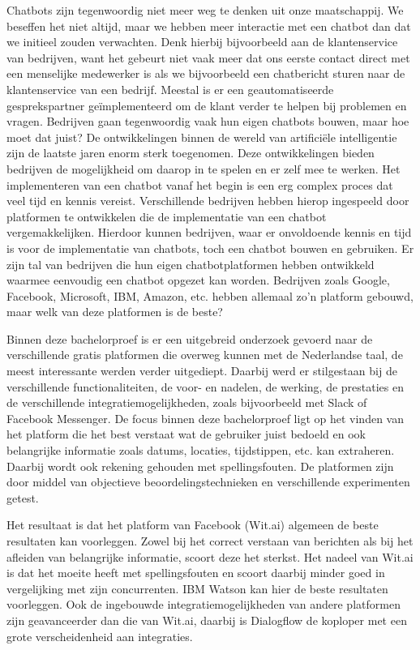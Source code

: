 Chatbots zijn tegenwoordig niet meer weg te denken uit onze maatschappij. We beseffen het niet altijd, maar we hebben meer interactie met een chatbot dan dat we initieel zouden verwachten. Denk hierbij bijvoorbeeld aan de klantenservice van bedrijven, want het gebeurt niet vaak meer dat ons eerste contact direct met een menselijke medewerker is als we bijvoorbeeld een chatbericht sturen naar de klantenservice van een bedrijf. Meestal is er een geautomatiseerde gesprekspartner geïmplementeerd om de klant verder te helpen bij problemen en vragen. Bedrijven gaan tegenwoordig vaak hun eigen chatbots bouwen, maar hoe moet dat juist? De ontwikkelingen binnen de wereld van artificiële intelligentie zijn de laatste jaren enorm sterk toegenomen. Deze ontwikkelingen bieden bedrijven de mogelijkheid om daarop in te spelen en er zelf mee te werken. Het implementeren van een chatbot vanaf het begin is een erg complex proces dat veel tijd en kennis vereist. Verschillende bedrijven hebben hierop ingespeeld door platformen te ontwikkelen die de implementatie van een chatbot vergemakkelijken. Hierdoor kunnen bedrijven, waar er onvoldoende kennis en tijd is voor de implementatie van chatbots, toch een chatbot bouwen en gebruiken. Er zijn tal van bedrijven die hun eigen chatbotplatformen hebben ontwikkeld waarmee eenvoudig een chatbot opgezet kan worden. Bedrijven zoals Google, Facebook, Microsoft, IBM, Amazon, etc. hebben allemaal zo’n platform gebouwd, maar welk van deze platformen is de beste?

Binnen deze bachelorproef is er een uitgebreid onderzoek gevoerd naar de verschillende gratis platformen die overweg kunnen met de Nederlandse taal, de meest interessante werden verder uitgediept. Daarbij werd er stilgestaan bij de verschillende functionaliteiten, de voor- en nadelen, de werking, de prestaties en de verschillende integratiemogelijkheden, zoals bijvoorbeeld met Slack of Facebook Messenger. De focus binnen deze bachelorproef ligt op het vinden van het platform die het best verstaat wat de gebruiker juist bedoeld en ook belangrijke informatie zoals datums, locaties, tijdstippen, etc. kan extraheren. Daarbij wordt ook rekening gehouden met spellingsfouten. De platformen zijn door middel van objectieve beoordelingstechnieken en verschillende experimenten getest. 

Het resultaat is dat het platform van Facebook (Wit.ai) algemeen de beste resultaten kan voorleggen. Zowel bij het correct verstaan van berichten als bij het afleiden van belangrijke informatie, scoort deze het sterkst. Het nadeel van Wit.ai is dat het moeite heeft met spellingsfouten en scoort daarbij minder goed in vergelijking met zijn concurrenten. IBM Watson kan hier de beste resultaten voorleggen. Ook de ingebouwde integratiemogelijkheden van andere platformen zijn geavanceerder dan die van Wit.ai, daarbij is Dialogflow de koploper met een grote verscheidenheid aan integraties.


